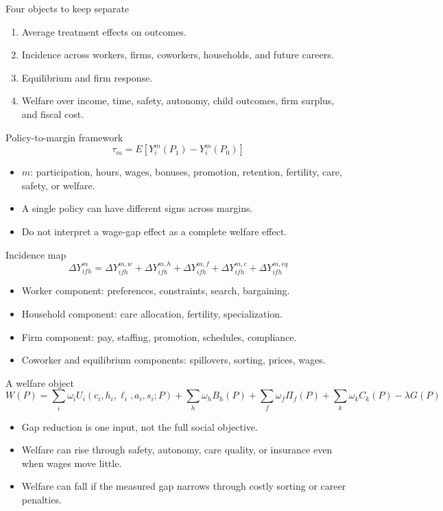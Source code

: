 \documentclass[aspectratio=169,11pt]{beamer}
\begin{document}
\begin{frame}{Four objects to keep separate}
\begin{enumerate}
    \item Average treatment effects on outcomes.
    \item Incidence across workers, firms, coworkers, households, and future careers.
    \item Equilibrium and firm response.
    \item Welfare over income, time, safety, autonomy, child outcomes, firm surplus, and fiscal cost.
\end{enumerate}
\end{frame}

\begin{frame}{Policy-to-margin framework}
\[
\tau_m=E\!\left[Y_i^m(P_1)-Y_i^m(P_0)\right]
\]
\begin{itemize}
    \item \(m\): participation, hours, wages, bonuses, promotion, retention, fertility, care, safety, or welfare.
    \item A single policy can have different signs across margins.
    \item Do not interpret a wage-gap effect as a complete welfare effect.
\end{itemize}
\end{frame}

\begin{frame}{Incidence map}
\[
\Delta Y_{ifh}^m
=
\Delta Y^{m,w}_{ifh}
+\Delta Y^{m,h}_{ifh}
+\Delta Y^{m,f}_{ifh}
+\Delta Y^{m,c}_{ifh}
+\Delta Y^{m,eq}_{ifh}
\]
\begin{itemize}
    \item Worker component: preferences, constraints, search, bargaining.
    \item Household component: care allocation, fertility, specialization.
    \item Firm component: pay, staffing, promotion, schedules, compliance.
    \item Coworker and equilibrium components: spillovers, sorting, prices, wages.
\end{itemize}
\end{frame}

\begin{frame}{A welfare object}
\[
W(P)=
\sum_i \omega_i U_i(c_i,h_i,\ell_i,a_i,s_i;P)
+\sum_h \omega_h B_h(P)
+\sum_f \omega_f \Pi_f(P)
+\sum_k \omega_k C_k(P)
-\lambda G(P)
\]
\begin{itemize}
    \item Gap reduction is one input, not the full social objective.
    \item Welfare can rise through safety, autonomy, care quality, or insurance even when wages move little.
    \item Welfare can fall if the measured gap narrows through costly sorting or career penalties.
\end{itemize}
\end{frame}
\end{document}
